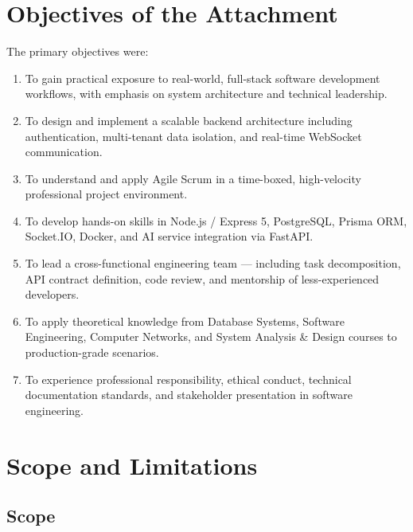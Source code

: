 \section{Objectives of the Attachment}
\label{sec:objectives}

The primary objectives were:

\begin{enumerate}
\item To gain practical exposure to real-world, full-stack software development workflows, with emphasis on system architecture and technical leadership.
\item To design and implement a scalable backend architecture including authentication, multi-tenant data isolation, and real-time WebSocket communication.
\item To understand and apply Agile Scrum in a time-boxed, high-velocity professional project environment.
\item To develop hands-on skills in Node.js / Express 5, PostgreSQL, Prisma ORM, Socket.IO, Docker, and AI service integration via FastAPI.
\item To lead a cross-functional engineering team --- including task decomposition, API contract definition, code review, and mentorship of less-experienced developers.
\item To apply theoretical knowledge from Database Systems, Software Engineering, Computer Networks, and System Analysis \& Design courses to production-grade scenarios.
\item To experience professional responsibility, ethical conduct, technical documentation standards, and stakeholder presentation in software engineering.
\end{enumerate}

\section{Scope and Limitations}
\label{sec:scope}

\subsection{Scope}

